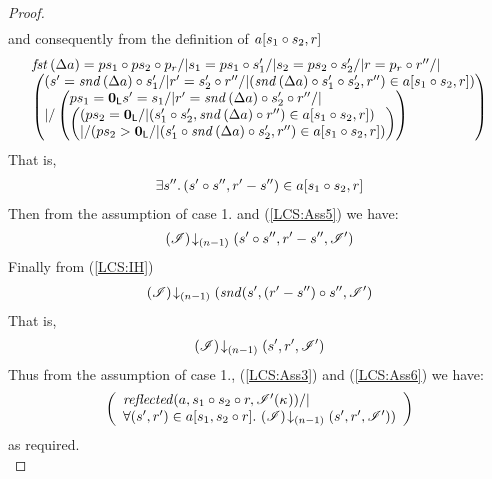 \begin{lemma}
\begin{proof}
\begin{align}
	\label{LCS:Ass4}
\end{align}
%
and consequently from the definition of $a[s_1 \circ s_2, r]$
%
\begin{align*}
	\begin{array}{l}
		\fst{\updateFP{a}} = ps_1 \composeL ps_2 \composeL p_r /| s_1 = ps_1 \composeL s'_1 /| s_2 = ps_2 \composeL s'_2 /| r = p_r \composeL r'' /| \\
		\left(
		\begin{array}{@{} l @{}}
			\left(s' = \snd{\updateFP{a}} \composeL s'_1 /| r' = s'_2 \composeL r'' /| (\snd{\updateFP{a}} \composeL s'_1 \composeL s'_2, r'') \in a[s_1 \composeL s_2, r] \right) \\
			|/ 
			\left(
			\begin{array}{@{} l @{}}
				 ps_1 = \unitL s' = s_1 /| r' = \snd{\updateFP{a}} \composeL s'_2 \composeL r'' /| \\
				 \left(
				 \begin{array}{@{} l @{}}
				 	(ps_2 = \unitL /| (s'_1 \composeL s'_2, \snd{\updateFP{a}} \composeL r'') \in a[s_1 \composeL s_2, r]) \\
				 	|/ (ps_2 > \unitL /| (s'_1 \composeL \snd{\updateFP{a}} \composeL s'_2, r'') \in a[s_1 \composeL s_2, r] )
				 \end{array}
				 \right)
			\end{array}
			\right)					
		\end{array}
		\right)
	\end{array}
\end{align*}
%
That is,
\begin{align}
	\exists s''.\, (s' \circ s'', r' - s'') \in a[s_1 \circ s_2, r]
	\label{LCS:Ass5}
\end{align}
% 
Then from the assumption of case 1. and (\ref{LCS:Ass5}) we have:
%
\begin{equation}
	\left(\mathscr{I}\right) \!\downarrow_{(n-1)} \left(s' \circ s'', r' - s'', \mathscr{I}'\right) \nonumber
\end{equation}
%
Finally from (\ref{LCS:IH})
%
\begin{align*}
	\left(\mathscr{I}\right) \!\downarrow_{(n-1)} \left(\mathit{snd}(s', (r' - s'') \circ s'', \mathscr{I}'\right) 
\end{align*}
% 
That is,
%
\begin{align}
	\left(\mathscr{I}\right) \!\downarrow_{(n-1)} \left(s', r', \mathscr{I}'\right) \label{LCS:Ass6}
\end{align}
% 
Thus from the assumption of case 1., (\ref{LCS:Ass3}) and (\ref{LCS:Ass6}) we have:
%
\begin{align*}
	\left(
	\begin{array}{l}
		\mathit{reflected}(a,s_1 \circ s_2 \circ r,\mathscr{I}'(\kappa_{})) /|\\
		\forall (s', r') \in a[s_1, s_2 \circ r].\, \left(\mathscr{I}\right) \!\downarrow_{(n-1)} \left(s', r', \mathscr{I}'\right))
	\end{array}	  
  \right)
\end{align*}
%
as required.\\




\end{proof}
\end{lemma}
